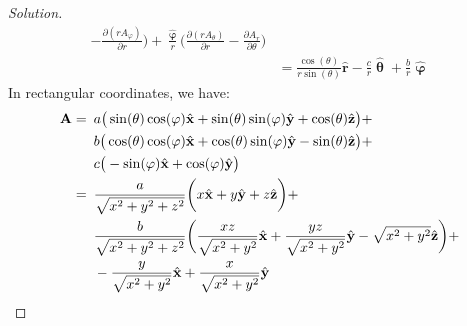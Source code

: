 \documentclass[crop=false,class=book,oneside]{standalone}
\begin{document}
\begin{proof}[Solution]
\begin{align*}
                        -\frac{\partial(rA_{\varphi})}{\partial{r}}
                    \bigg)
                    +\frac{\hat{\boldsymbol{\upvarphi}}}{r}
                    \bigg(
                        \frac{\partial(rA_{\theta})}{\partial{r}}
                        -\frac{\partial{A_{r}}}{\partial\theta}
                    \bigg)\\
                    &=\frac{\cos(\theta)}{r\sin(\theta)}\hat{\mathbf{r}}
                    -\frac{c}{r}\hat{\boldsymbol{\uptheta}}
                    +\frac{b}{r}\hat{\boldsymbol{\upvarphi}}
                \end{align*}
                In rectangular coordinates, we have:
                \begin{align*}
                    \mathbf{A}=\hspace{0.5em}
                    &a\big(\sin(\theta)\cos(\varphi)
                     \hat{\mathbf{x}}
                    +\sin(\theta)\sin(\varphi)
                     \hat{\mathbf{y}}
                    +\cos(\theta)\hat{\mathbf{z}}\big)+\\
                    &b\big(
                        \cos(\theta)\cos(\varphi)
                        \hat{\mathbf{x}}
                        +\cos(\theta)\sin(\varphi)
                        \hat{\mathbf{y}}
                        -\sin(\theta)\hat{\mathbf{z}}
                    \big)+\\
                    &c\big(
                        -\sin(\varphi)\hat{\mathbf{x}}
                        +\cos(\varphi)\hat{\mathbf{y}}
                    \big)\\
                    =\hspace{0.5em}
                    &\frac{a}{\sqrt{x^{2}+y^{2}+z^{2}}}
                    \bigg(
                        x\hat{\mathbf{x}}
                        +y\hat{\mathbf{y}}
                        +z\hat{\mathbf{z}}
                    \bigg)+\\
                    &\frac{b}{\sqrt{x^{2}+y^{2}+z^{2}}}
                    \bigg(
                        \frac{xz}{\sqrt{x^{2}+y^{2}}}
                        \hat{\mathbf{x}}
                        +\frac{yz}{\sqrt{x^{2}+y^{2}}}
                        \hat{\mathbf{y}}
                        -\sqrt{x^{2}+y^{2}}\hat{\mathbf{z}}
                    \bigg)+\\
                    &-\frac{y}{\sqrt{x^{2}+y^{2}}}\hat{\mathbf{x}}
                    +\frac{x}{\sqrt{x^{2}+y^{2}}}\hat{\mathbf{y}}\\

\end{align*}
\end{proof}
\end{document}
